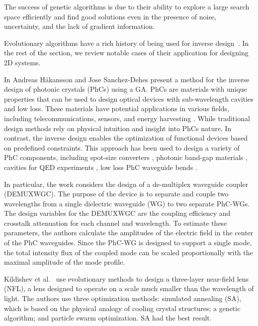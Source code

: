 The success of genetic algorithms is due to their ability to explore a large search space efficiently and find good solutions even in the presence of noise, uncertainty, and the lack of gradient information.

Evolutionary algorithms have a rich history of being used for inverse design~\cite{johnson1994genetic, sloss20202019}. In the rest of the section, we review notable cases of their application for designing 2D systems.

In \cite{hakanssonInverseDesignedPhotonic2005} Andreas H{\aa}kansson and Jose Sanchez-Dehes present a method for the inverse design of photonic crystals (PhCs) \cite{PhotonicCrystals2008,johnStrongLocalizationPhotons1987} using a GA. PhCs are materials with unique properties that can be used to design optical devices with sub-wavelength cavities and low loss. These materials have potential applications in various fields, including telecommunications, sensors, and energy harvesting \cite{Gan2015Photonic, Rifqi2019Modelling, Zhao2014Spherical}. While traditional design methods rely on physical intuition and insight into PhCs nature. In contrast,  the inverse design enables the optimization of functional devices based on predefined constraints. This approach has been used to design a variety of PhC components, including spot-size converters \cite{spuhler1998evolutionary}, photonic band-gap materials \cite{shen2003design}, cavities for QED experiments \cite{geremia2002inverse}, low loss PhC waveguide bends \cite{haakansson2005high}.

In particular, the work \cite{haakansson2005inverse} considers the design of a de-multiplex waveguide coupler (DEMUXWGC). The purpose of the device is to separate and couple two wavelengths from a single dielectric waveguide (WG) to two separate PhC-WGs. The design variables for the DEMUXWGC are the coupling efficiency and crosstalk attenuation for each channel and wavelength. To estimate these parameters, the authors calculate the amplitudes of the electric field in the center of the PhC waveguides. Since the PhC-WG is designed to support a single mode, the total intensity flux of the coupled mode can be scaled proportionally with the maximal amplitude of the mode profile.

Kildishev et al.~\cite{kildishevStochasticOptimizationLowloss2007a} use evolutionary methods to design a three-layer near-field lens (NFL), a lens designed to operate on a scale much smaller than the wavelength of light. The authors use three optimization methods: simulated annealing (SA), which is based on the physical analogy of cooling crystal structures; a genetic algorithm; and particle swarm optimization. SA had the best result.


